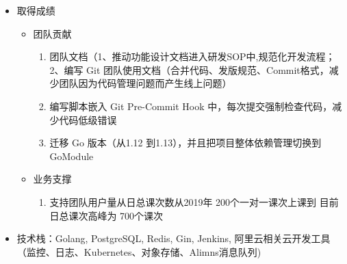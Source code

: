 \documentclass{resume}
\begin{document}
\begin{itemize}
  \item 取得成绩
        \begin{itemize}
          \item 团队贡献
                \begin{enumerate}
                  \item 团队文档（1、推动功能设计文档进入研发SOP中,规范化开发流程； 2、编写 Git 团队使用文档（合并代码、发版规范、Commit格式，减少团队因为代码管理问题而产生线上问题）
                  \item 编写脚本嵌入 Git Pre-Commit Hook 中，每次提交强制检查代码，减少代码低级错误
                  \item 迁移 Go 版本（从1.12 到1.13），并且把项目整体依赖管理切换到 GoModule
                \end{enumerate}
          \item 业务支撑
                \begin{enumerate}
                  \item 支持团队用户量从日总课次数从2019年 200个一对一课次上课到 目前日总课次高峰为 700个课次
                \end{enumerate}
        \end{itemize}
  \item 技术栈：Golang, PostgreSQL, Redis, Gin, Jenkins, 阿里云相关云开发工具（监控、日志、Kubernetes、对象存储、Alimns消息队列)
\end{itemize}
\end{document}
